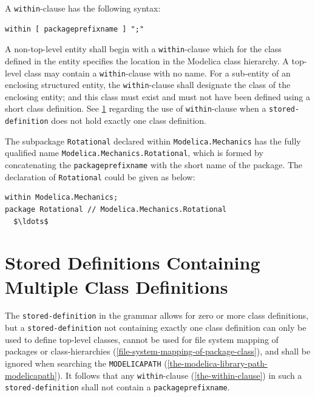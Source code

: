 A \lstinline!within!-clause has the following syntax:
\begin{lstlisting}[language=grammar]
  within [ packageprefixname ] ";"
\end{lstlisting}%
A non-top-level entity shall begin with a \lstinline!within!-clause which for the class defined in the entity specifies the location in the Modelica class hierarchy.
A top-level class may contain a \lstinline!within!-clause with no name.
For a sub-entity of an enclosing structured entity, the \lstinline!within!-clause shall designate the class of the enclosing entity; and this class must exist and must not have been defined using a short class definition.
See \cref{stored-definitions-containing-multiple-class-definitions} regarding the use of \lstinline!within!-clause when a \lstinline[language=grammar]!stored-definition! does not hold exactly one class definition.

\begin{example}
The subpackage \lstinline!Rotational! declared within \lstinline!Modelica.Mechanics! has the fully qualified name \lstinline!Modelica.Mechanics.Rotational!, which is formed by concatenating the \lstinline[language=grammar]!packageprefixname! with the short name of the package.
The declaration of \lstinline!Rotational! could be given as below:
\begin{lstlisting}[language=modelica]
within Modelica.Mechanics;
package Rotational // Modelica.Mechanics.Rotational
  $\ldots$
\end{lstlisting}
\end{example}


\section{Stored Definitions Containing Multiple Class Definitions}\label{stored-definitions-containing-multiple-class-definitions}

The \lstinline[language=grammar]!stored-definition! in the grammar allows for zero or more class definitions, but a \lstinline[language=grammar]!stored-definition! not containing exactly one class definition can only be used to define top-level classes, cannot be used for file system mapping of packages or class-hierarchies (\cref{file-system-mapping-of-package-class}), and shall be ignored when searching the \lstinline!MODELICAPATH! (\cref{the-modelica-library-path-modelicapath}).
It follows that any \lstinline!within!-clause (\cref{the-within-clause}) in such a \lstinline[language=grammar]!stored-definition! shall not contain a \lstinline[language=grammar]!packageprefixname!.



